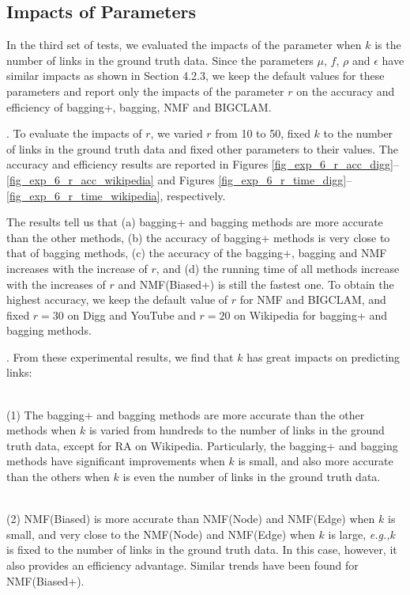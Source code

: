 \documentclass[10pt,journal,compsoc]{IEEEtran}
\newcommand{\stitle}[1]{\vspace{0.5ex}\noindent{\bf #1}}
\newcommand{\NMF}{{\sf NMF}\xspace }
\newcommand{\Node}{{\sf NMF(Node)}\xspace}
\newcommand{\Edge}{{\sf NMF(Edge)}\xspace}
\newcommand{\Biased}{{\sf NMF(Biased)}\xspace}
\newcommand{\RA}{{\sf RA}\xspace }
\newcommand{\BIGCLAM}{{\sf BIGCLAM}\xspace}
\newcommand{\Digg}{{\sf Digg}\xspace}
\newcommand{\YouTube}{{\sf YouTube}\xspace}
\newcommand{\Wikipedia}{{\sf Wikipedia}\xspace}
\newcommand{\Biasedp}{{\sf NMF(Biased+)}\xspace}
\newcommand{\eg}{\emph{e.g.,}\xspace}
\newcommand{\sstab}{\rule{0pt}{8pt}\\[-2.4ex]}
\begin{document}
\subsection{Impacts of Parameters}
In the third set of tests, we evaluated the impacts of the parameter when $k$
is the number of links in the ground truth data.
Since the parameters $\mu$, $f$, $\rho$ and $\epsilon$ have similar impacts as
shown in Section 4.2.3, we keep the default values for these parameters and
report only the impacts of the parameter $r$ on
the accuracy and  efficiency  of bagging+, bagging, \NMF and \BIGCLAM.

\stitle{Exp-6: Impacts of $r$}. To evaluate the impacts of $r$, we varied
$r$ from 10 to 50, fixed $k$ to the number of links in the ground truth data
and fixed other parameters to their values. The accuracy and  efficiency  results
are reported in Figures \ref{fig_exp_6_r_acc_digg}--\ref{fig_exp_6_r_acc_wikipedia}
and Figures \ref{fig_exp_6_r_time_digg}--\ref{fig_exp_6_r_time_wikipedia}, respectively.

The results tell us that (a) bagging+ and bagging methods are more accurate than
the other methods, (b) the accuracy of bagging+ methods is very close to that of bagging methods,
(c) the accuracy of the bagging+, bagging and \NMF increases with the increase of $r$,
and (d) the running time of all methods increase with the increases of $r$ and \Biasedp
is still the fastest one. To obtain the highest accuracy, we keep the default value of
$r$ for \NMF and \BIGCLAM, and fixed $r = 30$ on \Digg and \YouTube and $r = 20$ on
\Wikipedia for bagging+ and bagging methods.

\stitle{Remarks}. From these experimental results, we find that $k$ has great
impacts on predicting links:

\sstab (1) The bagging+ and bagging methods are more accurate than the other
methods when $k$ is varied from hundreds to the number of links in the ground
truth data, except for \RA on \Wikipedia. Particularly, the bagging+ and bagging
methods have significant improvements when $k$ is small, and also more accurate than
the others when $k$ is even the number of links in the ground truth data.

\sstab (2) \Biased is more accurate than \Node and \Edge when $k$ is small, and
very close to the \Node and \Edge when $k$ is large, \eg $k$ is fixed to the
number of links in the ground truth data. In this case, however, it also provides an efficiency
advantage. Similar trends have been found for \Biasedp.
\end{document}

